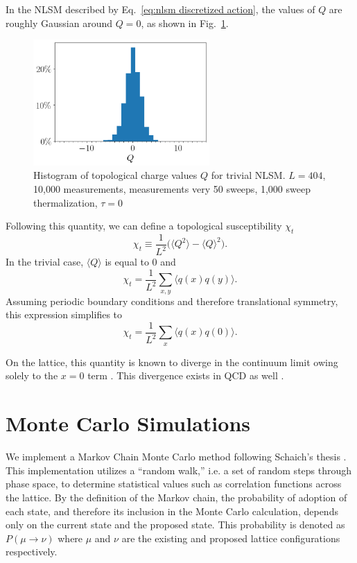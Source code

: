In the NLSM described by Eq.~\ref{eq:nlsm discretized action}, the values of $Q$ are roughly Gaussian around $Q=0$, as shown in Fig.~\ref{fig:hist}.
\begin{figure}[h]
    \centering
      \includegraphics[width=0.6\textwidth]{imgs/hist.png}
      \caption{\label{fig:hist} Histogram of topological charge values $Q$ for trivial NLSM. $L=404$, 10,000 measurements, measurements very 50 sweeps, 1,000 sweep thermalization, $\tau=0$}
\end{figure}

Following this quantity, we can define a topological susceptibility $\chi_t$
\begin{equation}
\chi_t \equiv \frac{1}{L^2} \Big( \langle Q^2 \rangle - \langle Q \rangle^2 \Big).
\end{equation}
In the trivial case, $\langle Q \rangle$ is equal to $0$ and   
\begin{equation}
    \chi_t = \frac{1}{L^2} \sum_{x,y} \langle q(x)q(y)\rangle.
\end{equation}
Assuming periodic boundary conditions and therefore translational symmetry, this expression simplifies to 
\begin{equation}
    \chi_t = \frac{1}{L^2} \sum_{x} \langle q(x)q(0)\rangle.
\end{equation}

On the lattice, this quantity is known to diverge in the continuum limit owing solely to the $x=0$ term \cite{bietenholz2018}. This divergence exists in QCD as well \cite{bruno2014}.


\section{Monte Carlo Simulations}
\label{sec:mc}
We implement a Markov Chain Monte Carlo method following Schaich's thesis \cite{schaich2006}. This implementation utilizes a ``random walk,'' i.e. a set of random steps through phase space, to determine statistical values such as correlation functions across the lattice. By the definition of the Markov chain, the probability of adoption of each state, and therefore its inclusion in the Monte Carlo calculation, depends only on the current state and the proposed state. This probability is denoted as $P(\mu\rightarrow\nu)$ where $\mu$ and $\nu$ are the existing and proposed lattice configurations respectively.

